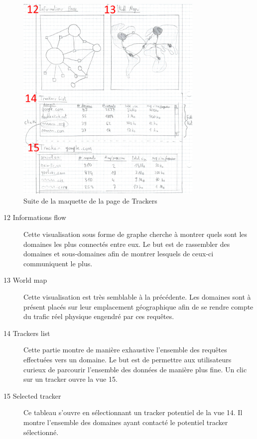 			\FloatBarrier

			\begin{figure}[!h]
				\centering
				\includegraphics[width=0.8\textwidth]{images/design/mockup_trackers2}
				\caption{Suite de la maquette de la page de Trackers}
				\label{d-mockup-trackers2}
			\end{figure}

			\begin{description}
				\item[12 Informations flow] Cette visualisation sous forme de graphe cherche à montrer quels sont les domaines les plus connectés entre eux. Le but est de rassembler des domaines et sous-domaines afin de montrer lesquels de ceux-ci communiquent le plus.
				\item[13 World map] Cette visualisation est très semblable à la précédente. Les domaines sont à présent placés sur leur emplacement géographique afin de se rendre compte du trafic réel physique engendré par ces requêtes.
				\item[14 Trackers list] Cette partie montre de manière exhaustive l'ensemble des requêtes effectuées vers un domaine. Le but est de permettre aux utilisateurs curieux de parcourir l'ensemble des données de manière plus fine. Un clic sur un tracker ouvre la vue 15.
				\item[15 Selected tracker] Ce tableau s'ouvre en sélectionnant un tracker potentiel de la vue 14. Il montre l'ensemble des domaines ayant contacté le potentiel tracker sélectionné.
			\end{description}

